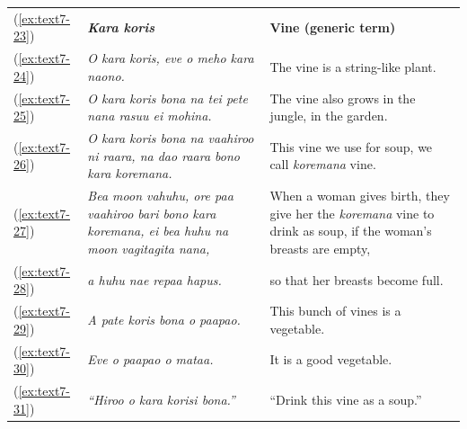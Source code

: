 \documentclass[output=paper]{langscibook}
\begin{document}
\begin{xltabular}{\textwidth}{lXX}
	(\ref{ex:text7-23})&\textbf{\textit{Kara koris}}&\textbf{Vine (generic term)}\\
	(\ref{ex:text7-24})&\textit{O kara koris, eve o meho kara naono.}&The vine is a string-like plant.\\
	(\ref{ex:text7-25})&\textit{O kara koris bona na tei pete nana rasuu ei mohina.}&The vine also grows in the jungle, in the garden.\\
	(\ref{ex:text7-26})&\textit{O kara koris bona na vaahiroo ni raara, na dao raara bono kara koremana.}&This vine we use for soup, we call \textit{koremana} vine.\\
	(\ref{ex:text7-27})&\textit{Bea moon vahuhu, ore paa vaahiroo bari bono kara koremana, ei bea huhu na moon vagitagita nana,}&When a woman gives birth, they give her the \textit{koremana} vine to drink as soup, if the woman's breasts are empty,\\
	(\ref{ex:text7-28})&\textit{a huhu nae repaa hapus.}&so that her breasts become full.  \\
	(\ref{ex:text7-29})&\textit{A pate koris bona o paapao.}&This bunch of vines is a vegetable.\\
	(\ref{ex:text7-30})&\textit{Eve o paapao o mataa.}&It is a good vegetable.\\
	(\ref{ex:text7-31})&\textit{``Hiroo o kara korisi bona.''}&``Drink this vine as a soup.'' \\
\end{xltabular}
\end{document}
